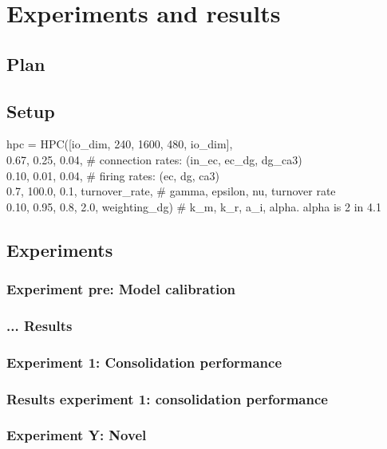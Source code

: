 
\chapter{Experiments and results}\label{chpt:experiments}

\section{Plan}

\section{Setup}

hpc = HPC([io\_dim, 240, 1600, 480, io\_dim], \\
          0.67, 0.25, 0.04,  \# connection rates: (in\_ec, ec\_dg, dg\_ca3) \\
          0.10, 0.01, 0.04,  \# firing rates: (ec, dg, ca3) \\
          0.7, 100.0, 0.1, turnover\_rate,  \# gamma, epsilon, nu, turnover rate \\
          0.10, 0.95, 0.8, 2.0, weighting\_dg)  \# k\_m, k\_r, a\_i, alpha. alpha is 2 in 4.1
          
\section{Experiments}
\subsection{Experiment pre: Model calibration}
\subsection{... Results}

\subsection{Experiment 1: Consolidation performance}
\subsection{Results experiment 1: consolidation performance}

\subsection{Experiment Y: Novel}



